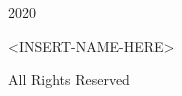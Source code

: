 \thispagestyle{empty}

\begin{center}
    \vspace*{18\baselineskip}
    \textcopyright \hspace{0.05cm} 2020
    
    <INSERT-NAME-HERE>
    
    All Rights Reserved
\end{center}

\newpage
